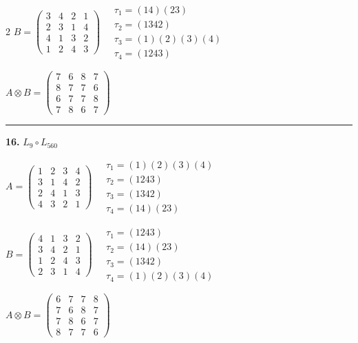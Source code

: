 \begin{multicols}{2}
$B = \begin{pmatrix} 3 & 4 & 2 & 1 \\ 2 & 3 & 1 & 4 \\ 4 & 1 & 3 & 2 \\ 1 & 2 & 4 & 3 \end{pmatrix} \quad \begin{matrix} \tau_{1}=(1 4)(2 3) \\ \tau_{2}=(1 3 4 2) \\ \tau_{3}=(1)(2)(3)(4) \\ \tau_{4}=(1 2 4 3) \end{matrix}$

$A \otimes B = \begin{pmatrix} 7 & 6 & 8 & 7 \\ 8 & 7 & 7 & 6 \\ 6 & 7 & 7 & 8 \\ 7 & 8 & 6 & 7 \end{pmatrix}$

\vspace{0.3em}
\hrule
\vspace{0.3em}

\noindent\textbf{16.} $L_{9} \circ L_{560}$

$A = \begin{pmatrix} 1 & 2 & 3 & 4 \\ 3 & 1 & 4 & 2 \\ 2 & 4 & 1 & 3 \\ 4 & 3 & 2 & 1 \end{pmatrix} \quad \begin{matrix} \tau_{1}=(1)(2)(3)(4) \\ \tau_{2}=(1 2 4 3) \\ \tau_{3}=(1 3 4 2) \\ \tau_{4}=(1 4)(2 3) \end{matrix}$

$B = \begin{pmatrix} 4 & 1 & 3 & 2 \\ 3 & 4 & 2 & 1 \\ 1 & 2 & 4 & 3 \\ 2 & 3 & 1 & 4 \end{pmatrix} \quad \begin{matrix} \tau_{1}=(1 2 4 3) \\ \tau_{2}=(1 4)(2 3) \\ \tau_{3}=(1 3 4 2) \\ \tau_{4}=(1)(2)(3)(4) \end{matrix}$

$A \otimes B = \begin{pmatrix} 6 & 7 & 7 & 8 \\ 7 & 6 & 8 & 7 \\ 7 & 8 & 6 & 7 \\ 8 & 7 & 7 & 6 \end{pmatrix}$


\end{multicols}
